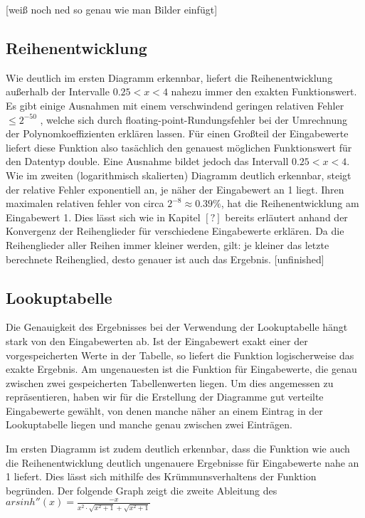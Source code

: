 \documentclass[course=erap] {aspdoc}
\begin{document}
     [weiß noch ned so genau wie man Bilder einfügt]
     
     \subsection{Reihenentwicklung}
     Wie deutlich im ersten Diagramm erkennbar, liefert die Reihenentwicklung außerhalb der Intervalle $0.25<x<4$ nahezu immer den exakten Funktionswert. Es gibt einige Ausnahmen mit einem verschwindend geringen relativen Fehler $\leq2^{-50}$ , welche sich durch floating-point-Rundungsfehler bei der Umrechnung der Polynomkoeffizienten erklären lassen.
     Für einen Großteil der Eingabewerte liefert diese Funktion also tasächlich den genauest möglichen Funktionswert für den Datentyp double. Eine Ausnahme bildet jedoch das Intervall $0.25<x<4$. Wie im zweiten (logarithmisch skalierten) Diagramm deutlich erkennbar, steigt der relative Fehler exponentiell an, je näher der Eingabewert an 1 liegt. Ihren maximalen relativen fehler von circa $2^{-8} \approx 0.39\%$, hat die Reihenentwicklung am Eingabewert 1. Dies lässt sich wie in Kapitel $[?]$ bereits erläutert anhand der Konvergenz der Reihenglieder für verschiedene Eingabewerte erklären. Da die Reihenglieder aller Reihen immer kleiner werden, gilt: je kleiner das letzte berechnete Reihenglied, desto genauer ist auch das Ergebnis. [unfinished]
     
     \subsection{Lookuptabelle}
     Die Genauigkeit des Ergebnisses bei der Verwendung der Lookuptabelle hängt stark von den Eingabewerten ab. Ist der Eingabewert exakt einer der vorgespeicherten Werte in der Tabelle, so liefert die Funktion logischerweise das exakte Ergebnis. Am ungenauesten ist die Funktion für Eingabewerte, die genau zwischen zwei gespeicherten Tabellenwerten liegen. Um dies angemessen zu repräsentieren, haben wir für die Erstellung der Diagramme gut verteilte Eingabewerte gewählt, von denen manche näher an einem Eintrag in der Lookuptabelle liegen und manche genau zwischen zwei Einträgen.  
     
     Im ersten Diagramm ist zudem deutlich erkennbar, dass die Funktion wie auch die Reihenentwicklung deutlich ungenauere Ergebnisse für Eingabewerte nahe an 1 liefert. Dies lässt sich mithilfe des Krümmunsverhaltens der Funktion begründen. Der folgende Graph zeigt die zweite Ableitung des $arsinh''(x) = \frac{-x}{x^2\cdot \sqrt{x^2+1}+\sqrt{x^2+1}}$
 
\end{document}
